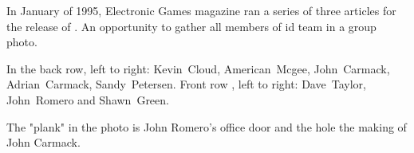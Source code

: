 \par
{}
\par





\begin{figure}
\end{figure}

In January of 1995, Electronic Games magazine ran a series of three articles for the release of \doomii{}. An opportunity to gather all members of id team in a group photo.\\
\par
 In the back row, left to right: Kevin~Cloud, American~Mcgee, John~Carmack, Adrian~Carmack, Sandy~Petersen. Front row , left to right: Dave~Taylor, John~Romero and Shawn~Green.\\
 \par The "plank" in the photo is John Romero's office door and the hole the making of John Carmack.\\
  \par
{}






